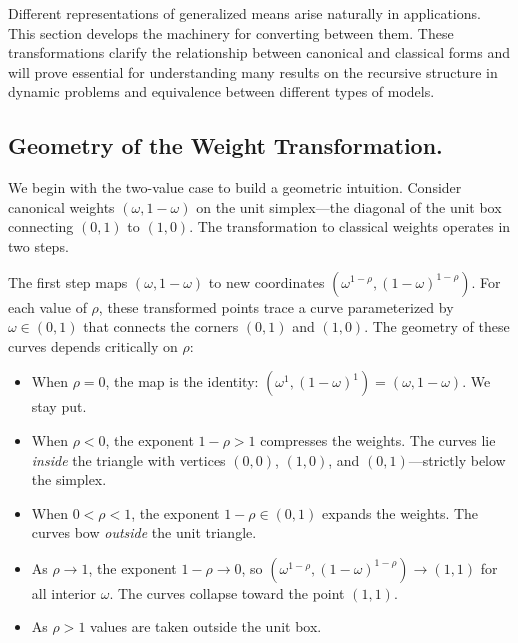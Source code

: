 
Different representations of generalized means arise naturally in applications. This section develops the machinery for converting between them. These transformations clarify the relationship between canonical and classical forms and will prove essential for understanding many results on the recursive structure in dynamic problems and equivalence between different types of models.

\subsection{Geometry of the Weight Transformation.}

We begin with the two-value case to build a geometric intuition. Consider canonical weights $(\omega, 1-\omega)$ on the unit simplex---the diagonal of the unit box connecting $(0,1)$ to $(1,0)$. The transformation to classical weights operates in two steps.

The first step maps $(\omega, 1-\omega)$ to new coordinates $(\omega^{1-\rho}, (1-\omega)^{1-\rho})$. For each value of $\rho$, these transformed points trace a curve parameterized by $\omega \in (0,1)$ that connects the corners $(0,1)$ and $(1,0)$. The geometry of these curves depends critically on $\rho$:
\begin{itemize}[leftmargin=1.5em]
    \item When $\rho = 0$, the map is the identity: $(\omega^1, (1-\omega)^1) = (\omega, 1-\omega)$. We stay put. 
    \item When $\rho < 0$, the exponent $1-\rho > 1$ compresses the weights. The curves lie \emph{inside} the triangle with vertices $(0,0)$, $(1,0)$, and $(0,1)$---strictly below the simplex.
    \item When $0 < \rho < 1$, the exponent $1-\rho \in (0,1)$ expands the weights. The curves bow \emph{outside} the unit triangle.
    \item As $\rho \to 1$, the exponent $1-\rho \to 0$, so $(\omega^{1-\rho}, (1-\omega)^{1-\rho}) \to (1,1)$ for all interior $\omega$. The curves collapse toward the point $(1,1)$.
    \item As $\rho > 1$ values are taken outside the unit box. 
\end{itemize}


